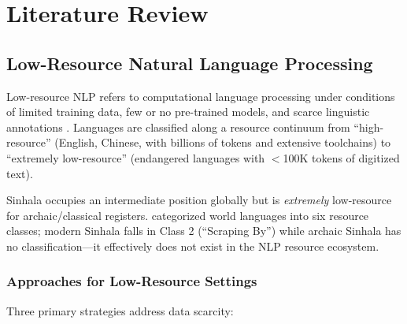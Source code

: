 \documentclass[12pt, a4paper, twoside]{report}
\begin{document}
\chapter{Literature Review}
\label{ch:literature}

\section{Low-Resource Natural Language Processing}
\label{sec:low-resource-nlp}

Low-resource NLP refers to computational language processing under conditions of limited training data, few or no pre-trained models, and scarce linguistic annotations \citep{hedderich2021survey}. Languages are classified along a resource continuum from ``high-resource'' (English, Chinese, with billions of tokens and extensive toolchains) to ``extremely low-resource'' (endangered languages with $<$100K tokens of digitized text).

Sinhala occupies an intermediate position globally but is \textit{extremely} low-resource for archaic/classical registers. \citet{joshi2020state} categorized world languages into six resource classes; modern Sinhala falls in Class 2 (``Scraping By'') while archaic Sinhala has no classification—it effectively does not exist in the NLP resource ecosystem.

\subsection{Approaches for Low-Resource Settings}

Three primary strategies address data scarcity:
\end{document}
